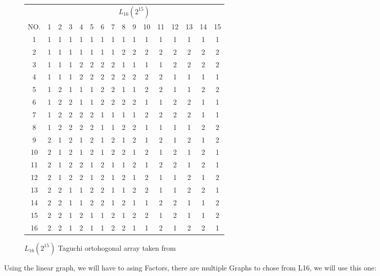 

\begin{figure}[!h]
	\centering
\begin{tabular}{ |c||c|c|c|c|c|c|c|c|c|c|c|c|c|c|c|  }
	\hline
	   & \multicolumn{15}{|c|}{ $L_{16}(2^{15})$ } \\
	NO.& 1 & 2 & 3 & 4 & 5 & 6 & 7 & 8 & 9 & 10& 11& 12& 13& 14&15\\
	\hline
	1  & 1 & 1 & 1 & 1 & 1 & 1 & 1 & 1 & 1 & 1 & 1 & 1 & 1 & 1 & 1\\
	2  & 1 & 1 & 1 & 1 & 1 & 1 & 1 & 2 & 2 & 2 & 2 & 2 & 2 & 2 & 2\\
	3  & 1 & 1 & 1 & 2 & 2 & 2 & 2 & 1 & 1 & 1 & 1 & 2 & 2 & 2 & 2\\
	4  & 1 & 1 & 1 & 2 & 2 & 2 & 2 & 2 & 2 & 2 & 2 & 1 & 1 & 1 & 1\\
	5  & 1 & 2 & 1 & 1 & 1 & 2 & 2 & 1 & 1 & 2 & 2 & 1 & 1 & 2 & 2\\
	6  & 1 & 2 & 2 & 1 & 1 & 2 & 2 & 2 & 2 & 1 & 1 & 2 & 2 & 1 & 1\\
	7  & 1 & 2 & 2 & 2 & 2 & 1 & 1 & 1 & 1 & 2 & 2 & 2 & 2 & 1 & 1\\
	8  & 1 & 2 & 2 & 2 & 2 & 1 & 1 & 2 & 2 & 1 & 1 & 1 & 1 & 2 & 2\\
	9  & 2 & 1 & 2 & 1 & 2 & 1 & 2 & 1 & 2 & 1 & 2 & 1 & 2 & 1 & 2\\
	10 & 2 & 1 & 2 & 1 & 2 & 1 & 2 & 2 & 1 & 2 & 1 & 2 & 1 & 2 & 1\\
	11 & 2 & 1 & 2 & 2 & 1 & 2 & 1 & 1 & 2 & 1 & 2 & 2 & 1 & 2 & 1\\
	12 & 2 & 1 & 2 & 2 & 1 & 2 & 1 & 2 & 1 & 2 & 1 & 1 & 2 & 1 & 2\\
	13 & 2 & 2 & 1 & 1 & 2 & 2 & 1 & 1 & 2 & 2 & 1 & 1 & 2 & 2 & 1\\
	14 & 2 & 2 & 1 & 1 & 2 & 2 & 1 & 2 & 1 & 1 & 2 & 2 & 1 & 1 & 2\\
	15 & 2 & 2 & 1 & 2 & 1 & 1 & 2 & 1 & 2 & 2 & 1 & 2 & 1 & 1 & 2\\
	16 & 2 & 2 & 1 & 2 & 1 & 1 & 2 & 2 & 1 & 1 & 2 & 1 & 2 & 2 & 1\\
	\hline
\end{tabular}
\caption{ $L_{16}(2^{15})$ Taguchi ortohogonal array taken from \cite{roy_primer_1990}}
\end{figure}

Using the linear graph, we will have to asing Factors, there are multiple Graphs to chose from L16, we will use this one:

